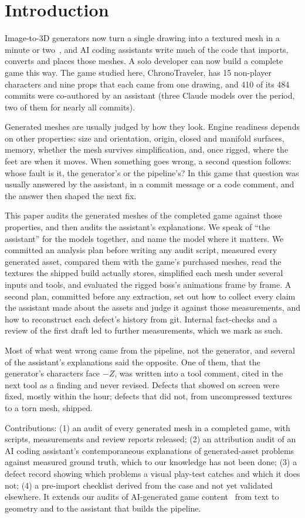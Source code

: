 \section{Introduction}

Image-to-3D generators now turn a single drawing into a textured mesh in a
minute or two~\cite{zhao2025hunyuan3d20,xiang2025trellis}, and AI coding
assistants write much of the code that imports, converts and places those meshes.
A solo developer can now build a complete game this way. The game studied here,
ChronoTraveler, has 15 non-player characters and nine props that each came from
one drawing, and 410 of its 484 commits were co-authored by an assistant (three
Claude models over the period, two of them for nearly all commits).

Generated meshes are usually judged by how they look. Engine readiness depends on
other properties: size and orientation, origin, closed and manifold surfaces,
memory, whether the mesh survives simplification, and, once rigged, where the
feet are when it moves. When something goes wrong, a second question follows:
whose fault is it, the generator's or the pipeline's? In this game that
question was usually answered by the assistant, in a commit message or a code
comment, and the answer then shaped the next fix.

This paper audits the generated meshes of the completed game against those
properties, and then audits the assistant's explanations. We speak of ``the
assistant'' for the models together, and name the model where it matters. We committed an
analysis plan before writing any audit script, measured every generated asset,
compared them with the game's purchased meshes, read the textures the shipped
build actually stores, simplified each mesh under several inputs and tools, and
evaluated the rigged boss's animations frame by frame. A second plan, committed
before any extraction, set out how to collect every claim the assistant made
about the assets and judge it against those measurements, and how to reconstruct
each defect's history from git. Internal fact-checks and a review of the first
draft led to further measurements, which we mark as such.

Most of what went wrong came from the pipeline, not the generator, and several
of the assistant's explanations said the opposite. One of them, that the
generator's characters face $-Z$, was written into a tool comment, cited in the
next tool as a finding and never revised. Defects that showed on screen were
fixed, mostly within the hour; defects that did not, from uncompressed textures
to a torn mesh, shipped.

Contributions: (1) an audit of every generated mesh in a completed game, with
scripts, measurements and review reports released; (2) an attribution audit of
an AI coding assistant's contemporaneous explanations of generated-asset problems
against measured ground truth, which to our knowledge has not been done; (3) a
defect record showing which problems a visual play-test catches and which it
does not; (4) a pre-import checklist derived from the case and not yet validated
elsewhere. It extends our audits of AI-generated game
content~\cite{zhao2026featureorleak,zhao2026countingwhat} from text to geometry
and to the assistant that builds the pipeline.
